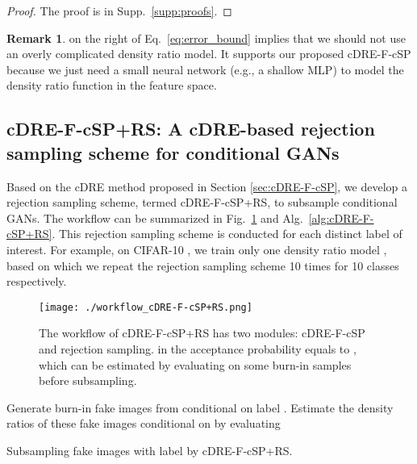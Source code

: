 \documentclass[10pt, twocolumn]{article}
\theoremstyle{definition}
\newtheorem{remark}{Remark}
\begin{document}
\begin{proof}
	The proof is in Supp.\ \ref{supp:proofs}.
\end{proof}

\begin{remark}
	 on the right of Eq.\ \eqref{eq:error_bound} implies that we should not use an overly complicated density ratio model. It supports our proposed cDRE-F-cSP because we just need a small neural network (e.g., a shallow MLP) to model the density ratio function in the feature space. 
\end{remark}




\subsection{cDRE-F-cSP+RS: A cDRE-based rejection sampling scheme for conditional GANs}\label{sec:cDRE-F-cSP+RS}

Based on the cDRE method proposed in Section \ref{sec:cDRE-F-cSP}, we develop a rejection sampling scheme, termed cDRE-F-cSP+RS, to subsample conditional GANs. The workflow can be summarized in Fig.\ \ref{fig:workflow_cDRE-F-cSP+RS} and Alg.\ \ref{alg:cDRE-F-cSP+RS}. This rejection sampling scheme is conducted for each distinct label  of interest. For example, on CIFAR-10 \cite{krizhevsky2009learning}, we train only one density ratio model , based on which we repeat the rejection sampling scheme 10 times for 10 classes respectively. 



\begin{figure}[!htbp]
	\centering
	\texttt{[image: ./workflow\_cDRE-F-cSP+RS.png]}  \caption{The workflow of cDRE-F-cSP+RS has two modules: cDRE-F-cSP and rejection sampling.  in the acceptance probability  equals to , which can be estimated by evaluating  on some burn-in samples before subsampling.}
	\label{fig:workflow_cDRE-F-cSP+RS}
\end{figure}

\begin{algorithm}[!htbp]
	\footnotesize
	\SetAlgoLined
	Generate  burn-in fake images from  conditional on label .\;
	Estimate the density ratios of these  fake images conditional on  by evaluating \;
	\;
	\;
	\caption{Subsampling fake images with label  by cDRE-F-cSP+RS.}
	\label{alg:cDRE-F-cSP+RS}
\end{algorithm}
\end{document}
